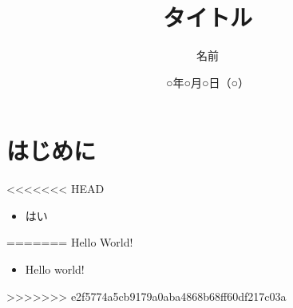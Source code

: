 \documentclass{jsarticle}
\title{タイトル}
\author{名前} %
\date{○年○月○日（○）} %
\begin{document}
\maketitle

\tableofcontents

\section{はじめに}
<<<<<<< HEAD
\begin{itemize}
  \item はい
\end{itemize}

=======
Hello World!
\begin{itemize}
  \item Hello world!
\end{itemize}
>>>>>>> e2f5774a5cb9179a0aba4868b68ff60df217c03a
\end{document}

